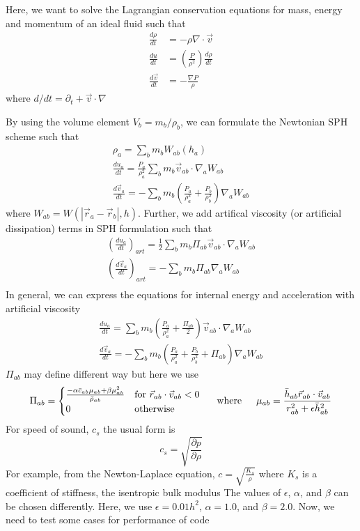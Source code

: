 \documentclass{article}
\begin{document}
Here, we want to solve the Lagrangian conservation equations for mass, energy and momentum of an ideal fluid such that
\begin{align}
\frac{d \rho}{d t} &= - \rho \nabla \cdot \vec{v} \\
\frac{d u}{d t} &= \left( \frac{P}{\rho^2} \right) \frac{d \rho}{d t} \\
\frac{d \vec{v}}{d t} &= - \frac{\nabla P}{\rho}
\end{align}
where $d/dt = \partial_t + \vec{v} \cdot \nabla$

By using the volume element $V_b = m_b / \rho_b$, we can formulate the Newtonian SPH scheme such that
\begin{align}
\rho_a = \sum_b m_b W_{ab} (h_a) \\
\frac{d u_a}{dt} = \frac{P_a}{\rho_a^2} \sum_b m_b \vec{v}_{ab} \cdot \nabla_a W_{ab} \\
\frac{d \vec{v}_a}{d t} = - \sum_b m_b \left(\frac{P_a}{\rho_a^2} + \frac{P_b}{\rho_b^2} \right) \nabla_a W_{ab}
\end{align}
where $W_{ab} = W(| \vec{r}_a - \vec{r}_b |,h)$. Further, we add artifical viscosity (or artificial dissipation) terms in SPH formulation such that
\begin{align}
\left(\frac{d u_a}{dt} \right)_{art} = \frac{1}{2} \sum_b m_b \Pi_{ab} \vec{v}_{ab} \cdot \nabla_a W_{ab}\\
\left(\frac{d\vec{v}_a}{dt} \right)_{art} = - \sum_b m_b \Pi_{ab}\nabla_a W_{ab}\\
\end{align}
In general, we can express the equations for internal energy and acceleration with artificial viscosity
\begin{align}
\frac{d u_a}{dt} = \sum_b m_b \left(\frac{P_a}{\rho_a^2} + \frac{\Pi_{ab}}{2} \right) \vec{v}_{ab} \cdot \nabla_a W_{ab} \\
\frac{d \vec{v}_a}{d t} = - \sum_b m_b \left(\frac{P_a}{\rho_a^2} + \frac{P_b}{\rho_b^2} + \Pi_{ab} \right) \nabla_a W_{ab}
\end{align}
$\Pi_{ab}$ may define different way but here we use
\begin{equation}
\Pi_{ab} = \begin{cases}
\frac{- \alpha \bar{c}_{ab} \mu_{ab} + \beta \mu_{ab}^2}{\bar{\rho}_{ab}} & \text{for $\vec{r}_{ab} \cdot \vec{v}_{ab} < 0$} \\
0 & \text{otherwise}
\end{cases}
\indent \text{where} \indent \mu_{ab} = \frac{\bar{h}_{ab} \vec{r}_{ab} \cdot \vec{v}_{ab}}{r^2_{ab} + \epsilon \bar{h}_{ab}^2}
\end{equation}
For speed of sound, $c_s$ the usual form is
\begin{equation}
c_s = \sqrt{\frac{\partial p}{\partial \rho}}
\end{equation}
For example, from the Newton-Laplace equation, $c = \sqrt{\frac{K_s}{\rho}}$ where $K_s$ is a coefficient of stiffness, the isentropic bulk modulus
The values of $\epsilon$, $\alpha$, and $\beta$ can be chosen differently. Here, we use $\epsilon = 0.01h^2$, $\alpha = 1.0$, and $\beta = 2.0$.
Now, we need to test some cases for performance of code
\end{document}
